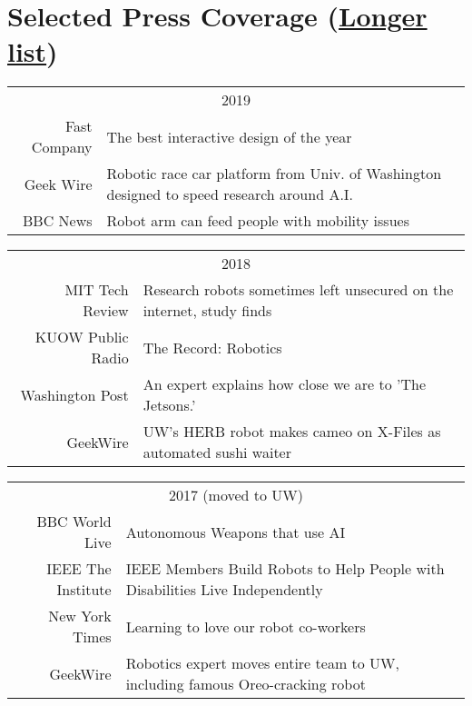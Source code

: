 \documentclass[10pt]{article}
\begin{document}
\section{Selected Press Coverage (\href{https://personalrobotics.cs.washington.edu/press/}{Longer list})}
\begin{tabularx}{\linewidth}{rX}
\multicolumn{2}{c}{2019}\\ 
Fast Company & The best interactive design of the year\\
Geek Wire & Robotic race car platform from Univ. of Washington designed to speed research around A.I.\\
BBC News & Robot arm can feed people with mobility issues\\
\end{tabularx}
\begin{tabularx}{\linewidth}{rX}
\multicolumn{2}{c}{2018}\\ 
MIT Tech Review & Research robots sometimes left unsecured on the internet, study finds\\
KUOW Public Radio & The Record: Robotics\\
Washington Post & An expert explains how close we are to 'The Jetsons.'\\
GeekWire & UW’s HERB robot makes cameo on X-Files as automated sushi waiter\\
\end{tabularx}
\begin{tabularx}{\linewidth}{rX}
\multicolumn{2}{c}{2017 (moved to UW)}\\ 
BBC World Live & Autonomous Weapons that use AI\\
IEEE The Institute &  IEEE Members Build Robots to Help People with Disabilities Live Independently\\
New York Times & Learning to love our robot co-workers\\
GeekWire & Robotics expert moves entire team to UW, including famous Oreo-cracking robot\\
\end{tabularx}
\newpage


\end{document}
